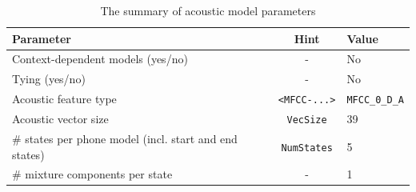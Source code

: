 \documentclass[onecolumn]{article}
\begin{document}
\begin{table}[ht]
\begin{tabular}{|p{}|c|p{}|}
\hline
Parameter & Hint & Value \\ \hline
Context-dependent models (yes/no) & - & No \\
Tying (yes/no)                    & - & No \\
Acoustic feature type             & \verb|<MFCC-...>| &  \verb|MFCC_0_D_A|\\
Acoustic vector size              & \verb|VecSize|    &  39  \\
\# states per phone model (incl. start and end states)  & \verb|NumStates| &  5\\
\# mixture components per state   & -    & 1 \\
\hline
\end{tabular}
\caption{The summary of acoustic model parameters}
\end{table}
\clearpage
\end{document}
